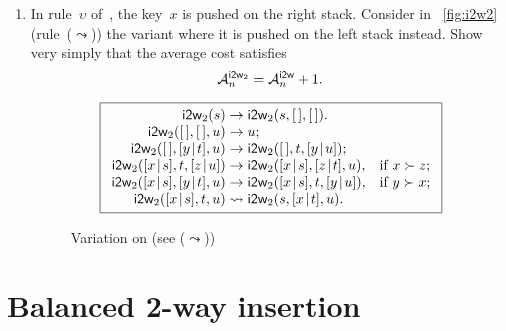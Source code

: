 \begin{enumerate}
  \item In rule~\(\upsilon\) of~,
    the key~\(x\) is pushed on the right stack. Consider in
    \fig~\vref{fig:i2w2} (rule~(\(\leadsto\))) the variant where it is
    pushed on the left stack instead. Show very simply that the
    average cost satisfies
     
    \begin{equation*}
      \M{\fun{i2w}_2}{n} = \M{\fun{i2w}}{n} + 1.
    \end{equation*}
    \begin{figure}[h]
    \begin{equation*}
      \boxed{%
      \begin{array}{r@{\;}l@{\;}ll}
        \fun{i2w}_2(s)         & \rightarrow
                               & \fun{i2w}_2(s,\el,\el).\\
        \fun{i2w}_2(\el,\el,u) & \rightarrow
                               & u;\\
        \fun{i2w}_2(\el,\cons{y}{t},u)
                               & \rightarrow
                               & \fun{i2w}_2(\el,t,\cons{y}{u});\\
        \fun{i2w}_2(\cons{x}{s},t,\cons{z}{u})
                               & \rightarrow
                               & \fun{i2w}_2(\cons{x}{s},\cons{z}{t},u),
                               & \text{if \(x \succ z\)};\\
        \fun{i2w}_2(\cons{x}{s},\cons{y}{t},u)
                               & \rightarrow
                               & \fun{i2w}_2(\cons{x}{s},t,\cons{y}{u}),
                               & \text{if \(y \succ x\)};\\
        \fun{i2w}_2(\cons{x}{s},t,u)
                               & \leadsto
                               & \fun{i2w}_2(s,\cons{x}{t},u).
      \end{array}}
    \end{equation*}
    \caption{Variation  on  (see
      (\(\leadsto\)))\label{fig:i2w2}}
    \end{figure}

\end{enumerate}

\section{Balanced 2-way insertion}


